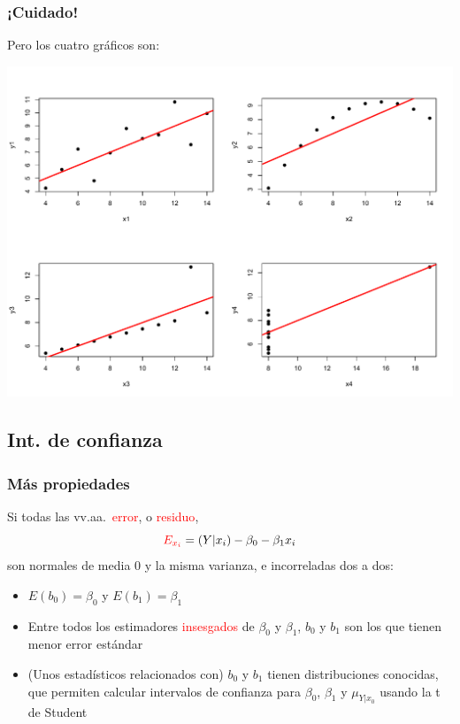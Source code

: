 \documentclass[12pt,t]{beamer}
\newcommand{\red}[1]{\textcolor{red}{#1}}
\theoremstyle{plain}
\theoremstyle{definition}
\begin{document}
\begin{frame}
\frametitle{¡Cuidado!}

Pero los cuatro gráficos son:\vspace*{-2ex}

\begin{center}
\includegraphics[width=\linewidth]{mismo_r2.pdf}
\end{center}

\end{frame}



\subsection{Int. de confianza}

\begin{frame}
\frametitle{Más propiedades}

Si todas las vv.aa.\ \red{error}, o \red{residuo},
$$
\red{E_{x_i}}=(Y|x_i)-\beta_0-\beta_1 x_i
$$
son normales de media 0 y la misma varianza, e incorreladas dos a dos:\medskip

\begin{itemize}
\item $E(b_0)=\beta_0$ y $E(b_1)=\beta_1$\medskip

\item Entre todos los estimadores \red{insesgados} de $\beta_0$ y $\beta_1$, $b_0$ y $b_1$ son los que tienen menor error estándar\medskip

\item (Unos estadísticos relacionados con) $b_0$ y $b_1$ tienen distribuciones conocidas, que permiten calcular intervalos de confianza para $\beta_0$, $\beta_1$ y $\mu_{Y|x_0}$ usando la t de Student
\end{itemize}

\end{frame}
\end{document}
